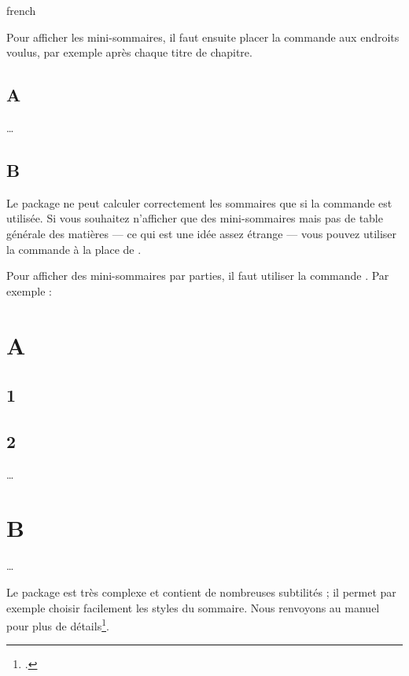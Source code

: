 \begin{latexcode}
\usepackage{minitoc}{french}
\dominitoc
\end{latexcode}

Pour afficher les mini-sommaires, il faut ensuite placer la commande  aux endroits voulus, par exemple après chaque titre de chapitre.

\begin{latexcode}
\chapter{A}
\minitoc
…
\chapter{B}
\minitoc
\end{latexcode}

\begin{attention}
Le package ne peut calculer correctement les sommaires que si la commande  est utilisée. Si vous souhaitez n'afficher que des mini-sommaires mais pas de table générale des matières --- ce qui est une idée assez étrange --- vous pouvez utiliser  la commande  à la place de .
\end{attention}

Pour afficher des mini-sommaires par parties, il faut utiliser la commande . Par exemple :

\begin{latexcode}
\part{A}
\parttoc
\chapter{1}
\chapter{2}
…
\part{B}
\parttoc
…
\end{latexcode}


Le package  est très complexe et contient de nombreuses subtilités ; il permet  par exemple choisir facilement les styles du sommaire. Nous renvoyons au manuel pour plus de détails\footcites{minitoc}[en particulier][]{minitoc_typesetting}.

